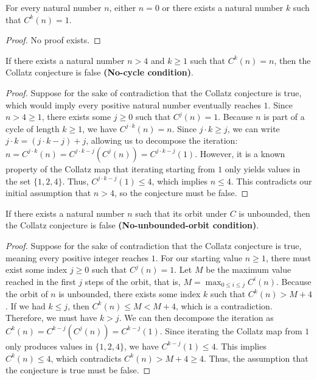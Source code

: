 \begin{theorem}\label{thm:collatz_conjecture}\leanok
For every natural number $n$, either $n = 0$ or there exists a natural number $k$ such that
$C^k(n) = 1$.
\end{theorem}
\begin{proof}
No proof exists.
\end{proof}

\begin{lemma}\label{lemma:cycle_implies_not_collatz}\leanok
If there exists a natural number $n > 4$ and $k \ge 1$ such that $C^k(n) = n$, then the Collatz
conjecture is false {\bf (No-cycle condition)}.
\end{lemma}
\begin{proof}\leanok
Suppose for the sake of contradiction that the Collatz conjecture is true, which would imply every positive natural number eventually reaches $1$.
Since $n > 4 \ge 1$, there exists some $j \ge 0$ such that $C^j(n) = 1$.
Because $n$ is part of a cycle of length $k \ge 1$, we have $C^{j \cdot k}(n) = n$.
Since $j \cdot k \ge j$, we can write $j \cdot k = (j \cdot k - j) + j$, allowing us to decompose the iteration:
$n = C^{j \cdot k}(n) = C^{j \cdot k - j}(C^j(n)) = C^{j \cdot k - j}(1)$.
However, it is a known property of the Collatz map that iterating starting from $1$ only yields values in the set $\{1, 2, 4\}$.
Thus, $C^{j \cdot k - j}(1) \le 4$, which implies $n \le 4$.
This contradicts our initial assumption that $n > 4$, so the conjecture must be false.
\end{proof}

\begin{lemma}\label{lemma:unbounded_orbit_implies_not_collatz}\leanok
If there exists a natural number $n$ such that its orbit under $C$ is unbounded, then the Collatz
conjecture is false {\bf (No-unbounded-orbit condition)}.
\end{lemma}
\begin{proof}\leanok
Suppose for the sake of contradiction that the Collatz conjecture is true, meaning every positive integer reaches $1$.
For our starting value $n \ge 1$, there must exist some index $j \ge 0$ such that $C^j(n) = 1$.
Let $M$ be the maximum value reached in the first $j$ steps of the orbit, that is, $M = \max_{0 \le i \le j} C^i(n)$.
Because the orbit of $n$ is unbounded, there exists some index $k$ such that $C^k(n) > M + 4$.
If we had $k \le j$, then $C^k(n) \le M < M + 4$, which is a contradiction.
Therefore, we must have $k > j$.
We can then decompose the iteration as $C^k(n) = C^{k-j}(C^j(n)) = C^{k-j}(1)$.
Since iterating the Collatz map from $1$ only produces values in $\{1, 2, 4\}$, we have $C^{k-j}(1) \le 4$.
This implies $C^k(n) \le 4$, which contradicts $C^k(n) > M + 4 \ge 4$.
Thus, the assumption that the conjecture is true must be false.
\end{proof}

